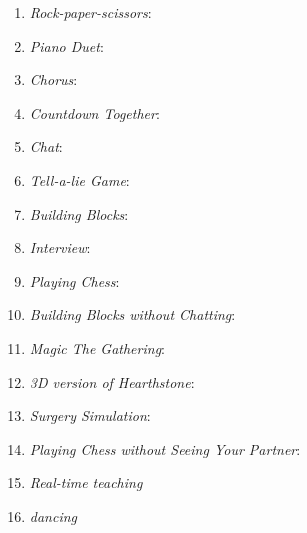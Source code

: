 \begin{enumerate}
    \item \emph{Rock-paper-scissors}:
    \item \emph{Piano Duet}:
    \item \emph{Chorus}:
    \item \emph{Countdown Together}:
    \item \emph{Chat}:
    \item \emph{Tell-a-lie Game}:
    \item \emph{Building Blocks}:
    \item \emph{Interview}:
    \item \emph{Playing Chess}:
    \item \emph{Building Blocks without Chatting}:
    \item \emph{Magic The Gathering}:
    \item \emph{3D version of Hearthstone}:
    \item \emph{Surgery Simulation}:
    \item \emph{Playing Chess without Seeing Your Partner}:
    \item \emph{Real-time teaching}
    \item \emph{dancing}
\end{enumerate}
